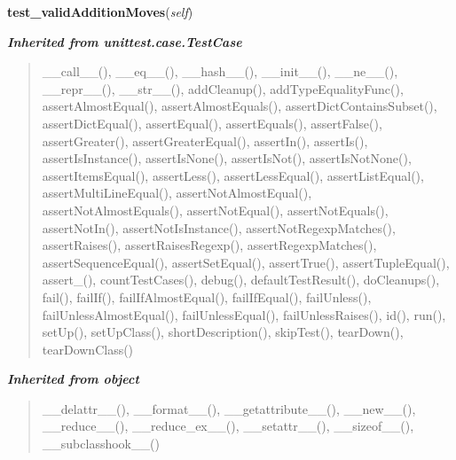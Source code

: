     \label{UnBlockMeSolver:test:MapTests:mapTests:TestMap:test_validAdditionMoves}

    \vspace{0.5ex}

\hspace{.8\funcindent}\begin{boxedminipage}{\funcwidth}

    \raggedright \textbf{test\_validAdditionMoves}(\textit{self})

\setlength{\parskip}{2ex}
\setlength{\parskip}{1ex}
    \end{boxedminipage}


\large{\textbf{\textit{Inherited from unittest.case.TestCase}}}

\begin{quote}
\_\_call\_\_(), \_\_eq\_\_(), \_\_hash\_\_(), \_\_init\_\_(), \_\_ne\_\_(), \_\_repr\_\_(), \_\_str\_\_(), addCleanup(), addTypeEqualityFunc(), assertAlmostEqual(), assertAlmostEquals(), assertDictContainsSubset(), assertDictEqual(), assertEqual(), assertEquals(), assertFalse(), assertGreater(), assertGreaterEqual(), assertIn(), assertIs(), assertIsInstance(), assertIsNone(), assertIsNot(), assertIsNotNone(), assertItemsEqual(), assertLess(), assertLessEqual(), assertListEqual(), assertMultiLineEqual(), assertNotAlmostEqual(), assertNotAlmostEquals(), assertNotEqual(), assertNotEquals(), assertNotIn(), assertNotIsInstance(), assertNotRegexpMatches(), assertRaises(), assertRaisesRegexp(), assertRegexpMatches(), assertSequenceEqual(), assertSetEqual(), assertTrue(), assertTupleEqual(), assert\_(), countTestCases(), debug(), defaultTestResult(), doCleanups(), fail(), failIf(), failIfAlmostEqual(), failIfEqual(), failUnless(), failUnlessAlmostEqual(), failUnlessEqual(), failUnlessRaises(), id(), run(), setUp(), setUpClass(), shortDescription(), skipTest(), tearDown(), tearDownClass()
\end{quote}

\large{\textbf{\textit{Inherited from object}}}

\begin{quote}
\_\_delattr\_\_(), \_\_format\_\_(), \_\_getattribute\_\_(), \_\_new\_\_(), \_\_reduce\_\_(), \_\_reduce\_ex\_\_(), \_\_setattr\_\_(), \_\_sizeof\_\_(), \_\_subclasshook\_\_()
\end{quote}

